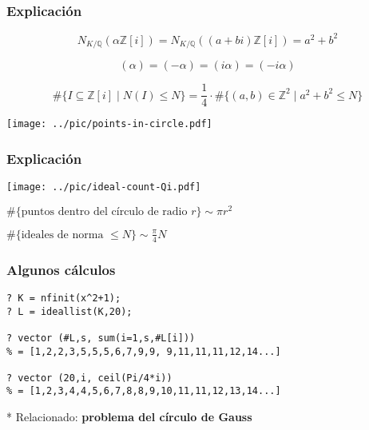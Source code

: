 \documentclass{beamer}
\newcommand{\ZZ}{\mathbb{Z}}
\newcommand{\QQ}{\mathbb{Q}}
\begin{document}

\begin{frame}[fragile]
  \frametitle{Explicación}

  $$N_{K/\QQ} (\alpha\ZZ[i]) = N_{K/\QQ} ((a+bi)\ZZ[i]) = a^2 + b^2$$

  $$(\alpha) = (-\alpha) = (i\alpha) = (-i\alpha)$$

  \[ \#\{ I \subseteq \ZZ [i] \mid N (I) \le N \} =
  \frac{1}{4}\cdot \# \{ (a,b) \in \ZZ^2 \mid a^2 + b^2 \le N \} \]

  \begin{center}
    \texttt{[image: ../pic/points-in-circle.pdf]}
  \end{center}
\end{frame}


\begin{frame}[fragile]
  \frametitle{Explicación}

  \begin{center}
    \texttt{[image: ../pic/ideal-count-Qi.pdf]}

    $\# \{ \text{puntos dentro del círculo de radio }r \} \sim \pi r^2$

    $\# \{ \text{ideales de norma }\le N \} \sim \frac{\pi}{4} N$
  \end{center}
\end{frame}


\begin{frame}[fragile]
  \frametitle{Algunos cálculos}

  \begin{shaded}
\begin{verbatim}
? K = nfinit(x^2+1);
? L = ideallist(K,20);

? vector (#L,s, sum(i=1,s,#L[i]))
% = [1,2,2,3,5,5,5,6,7,9,9, 9,11,11,11,12,14...]

? vector (20,i, ceil(Pi/4*i))
% = [1,2,3,4,4,5,6,7,8,8,9,10,11,11,12,13,14...]
\end{verbatim}
  \end{shaded}

  * Relacionado: \textbf{problema del círculo de Gauss}
\end{frame}

\end{document}
